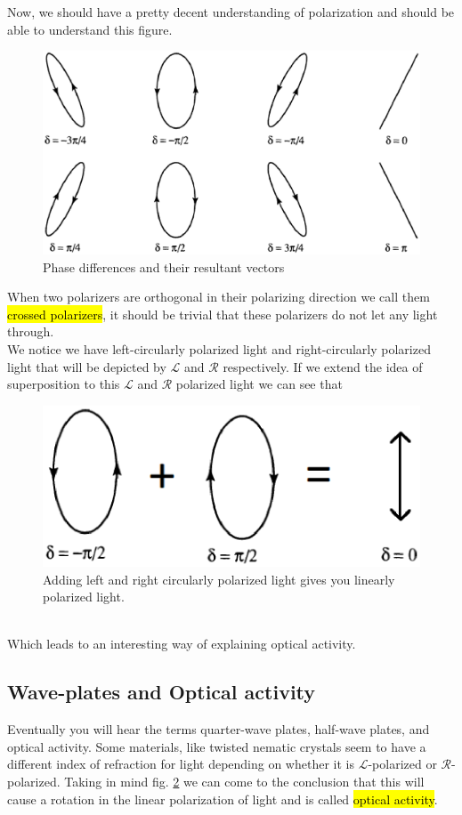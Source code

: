 \documentclass{article}
\begin{document}
Now, we should have a pretty decent understanding of polarization and should be able to understand this figure.
\begin{figure}[!phbt]
    \centering
    \includegraphics[width=0.55\linewidth]{img/polarpolarization.eps}
    \caption{Phase differences and their resultant vectors}
    \label{fig:polarpolarization}
\end{figure}

When two polarizers are orthogonal in their polarizing direction we call them \hl{crossed polarizers}, it should be trivial that these polarizers do not let any light through.
\\
We notice we have left-circularly polarized light and right-circularly polarized light that will be depicted by $\mathcal{L}$ and $\mathcal{R}$ respectively.
If we extend the idea of superposition to this $\mathcal{L}$ and $\mathcal{R}$ polarized light we can see that
\begin{figure}[!phbt]
    \centering
    \includegraphics[width=0.5\linewidth]{img/leftright.eps}
    \caption{Adding left and right circularly polarized light gives you linearly polarized light.}
    \label{fig:leftright}
\end{figure}
\\
Which leads to an interesting way of explaining optical activity.

\subsection{Wave-plates and Optical activity}
Eventually you will hear the terms quarter-wave plates, half-wave plates, and optical activity.
Some materials, like twisted nematic crystals seem to have a different index of refraction for light depending on whether it is $\mathcal{L}$-polarized or $\mathcal{R}$-polarized. Taking in mind fig. \ref{fig:leftright} we can come to the conclusion that this will cause a rotation in the linear polarization of light and is called \hl{optical activity}.
\end{document}
